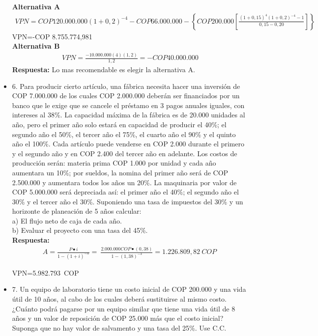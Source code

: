 \begin{itemize}
       \textbf{Alternativa A}
       \begin{align*}
        VPN=COP 120.000.000\left(1+0,2\right)^{-4}-COP 66.000.000-\left\{COP 200.000\left[\frac{\left(1+0,15\right)^4\left(1+0,2\right)^{-4}-1}{0,15-0,20}\right]\right\}
       \end{align*}
       VPN=-COP 8.755.774,981
       \\
       \textbf{Alternativa B}
       \begin{align*}
        VPN=\frac{-10.000.000\left(4\right)\left(1,2\right)}{1,2}=-COP 40.000.000
       \end{align*}
       \textbf{Respuesta:} Lo mas recomendable es elegir la alternativa A.
       \medskip

 \item 6. Para producir cierto artículo, una fábrica necesita hacer una inversión de COP 7.000.000 de los cuales COP 2.000.000 deberán ser financiados por un banco que le exige que se cancele el préstamo en 3 pagos anuales iguales, con intereses al 38\%. La capacidad máxima de la fábrica es de 20.000 unidades al año, pero el primer año solo estará en capacidad de producir el 40\%; el segundo año el 50\%, el tercer año el 75\%, el cuarto año el 90\% y el quinto año el 100\%. Cada artículo puede venderse en COP 2.000 durante el primero y el segundo año y en COP 2.400 del tercer año en adelante. Los costos de producción serán: materia prima COP 1.000 por unidad y cada año aumentara un 10\%; por sueldos, la nomina del primer año será de COP 2.500.000 y aumentara todos los años un 20\%. La maquinaria por valor de COP 5.000.000 será depreciada así: el primer año el 40\%; el segundo año el 30\% y el tercer año el 30\%. Suponiendo una tasa de impuestos del 30\% y un horizonte de planeación de 5 años calcular: \\

       a) El flujo neto de caja de cada año.\\
       b) Evaluar el proyecto con una tasa del 45\%.\\

       \textbf{Respuesta:}
       \setlength{\parskip}{0cm}
       \begin{align*}
        A=\frac{P\bullet i}{1-{(1+i)}^{-n}}=\ \frac{2.000.000COP\bullet(0,38)}{1-{(1,38)}^{-3}}=1.226.809,82\  COP \
       \end{align*}

       VPN=5.982.793\  COP 
       \medskip

 \item 7. Un equipo de laboratorio tiene un costo inicial de COP 200.000 y una vida útil de 10 años, al cabo de los cuales deberá sustituirse al mismo costo. ¿Cuánto podrá pagarse por un equipo similar que tiene una vida útil de 8 años y un valor de reposición de COP 25.000 más que el costo inicial? Suponga que no hay valor de salvamento y una tasa del 25\%. Use C.C. \\


\end{itemize}
